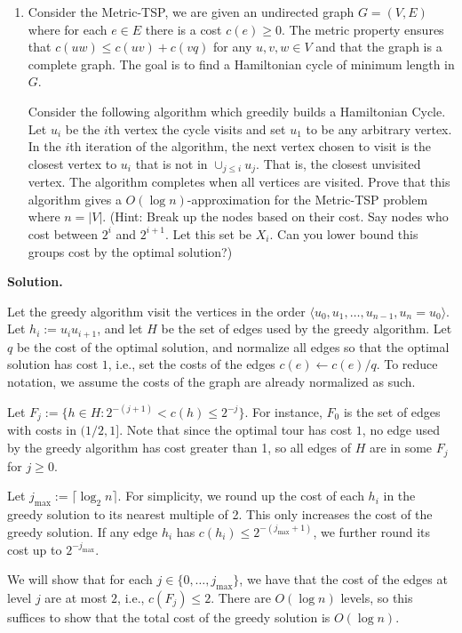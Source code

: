 \documentclass[11pt,letterpaper]{article}
\theoremstyle{definition}
\newcommand{\solution}{\medskip\noindent\textbf{Solution.}\par\medskip}
\begin{document}
\begin{enumerate}[resume=q]
\item Consider the Metric-TSP, we are given an undirected graph $G = (V, E)$ where for each $e \in E$ there is a cost $c(e) \geq 0$. The metric property ensures that $c(uw) \leq c(uv) + c(vq)$ for any $u, v, w \in V$ and that the graph is a complete graph. The goal is to find a Hamiltonian cycle of minimum length in $G$.

Consider the following algorithm which greedily builds a Hamiltonian Cycle. Let $u_i$ be the $i$th vertex the cycle visits and set $u_1$ to be any arbitrary vertex. In the $i$th iteration of the algorithm, the next vertex chosen to visit is the closest vertex to $u_i$ that is not in $\cup_{j \leq i} u_j$. That is, the closest unvisited vertex. The algorithm completes when all vertices are visited. Prove that this algorithm gives a $O(\log n)$-approximation for the Metric-TSP problem where $n = |V|$. (Hint: Break up the nodes based on their cost. Say nodes who cost between $2^i$ and $2^{i+1}$. Let this set be $X_i$. Can you lower bound this groups cost by the optimal solution?)
\end{enumerate}

\solution

Let the greedy algorithm visit the vertices in the order $\langle u_0, u_1, \dots , u_{n-1}, u_n = u_0\rangle$.
Let $h_i:= u_iu_{i+1}$, and let $H$ be the set of edges used by the greedy algorithm.
Let $q$ be the cost of the optimal solution, and normalize all edges so that the optimal solution has cost $1$, i.e., set the costs of the edges $c(e)\gets c(e)/q$. 
To reduce notation, we assume the costs of the graph are already normalized as such.

Let $F_j:=\{h\in H: 2^{-(j+1)}<c(h)\leq 2^{-j}\}$. For instance, $F_0$ is the set of edges with costs in $(1/2, 1]$.
Note that since the optimal tour has cost $1$, no edge used by the greedy algorithm has cost greater than 1, so all edges of $H$ are in some $F_j$ for $j\geq 0$.

Let $j_{\max} := \lceil\log_2 n\rceil$. For simplicity, we round up the cost of each $h_i$ in the greedy solution to its nearest multiple of 2. 
This only increases the cost of the greedy solution. 
If any edge $h_i$ has $c(h_i)\leq 2^{-(j_{\max}+1)}$, we further round its cost up to $2^{-j_{\max}}$.

We will show that for each $j\in \{0,\dots, j_{\max}\}$, we have that the cost of the edges at level $j$ are at most $2$, i.e., $c(F_j)\leq 2$. 
There are $O(\log n)$ levels, so this suffices to show that the total cost of the greedy solution is $O(\log n)$.
\end{document}
